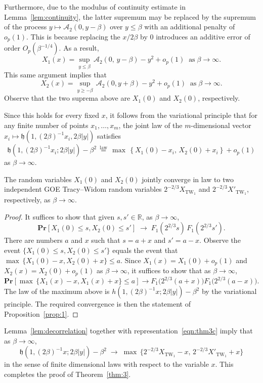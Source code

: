 \documentclass[AHL,Unicode,longabstracts]{cedram}
\DeclareMathOperator{\tw}{TW}
\newcommand{\pr}[1]{\mathbf{Pr}\left[#1\right]}
\newcommand{\R}{\mathbb{R}}
\newcommand{\A}{\mathcal{A}}
\newcommand{\h}{\mathfrak{h}}
\begin{document}
Furthermore, due to the modulus of continuity estimate in Lemma~\ref{lem:continuity}, the latter supremum may be replaced by the supremum of the process $y \mapsto \A_2 (0, y-\beta )$ over $y \leq \beta$ with an additional penalty of $o_p(1)$. This is because replacing the $x/2\beta$ by $0$ introduces an additive error of order $O_p(\beta^{-1/4})$. As a result,
\[
X_1(x) = \sup_{y \leq \beta}\, \A_2(0, \, y-\beta) -y^2 + o_p(1)\;\; \text{as}\; \beta \to \infty.
\]
This same argument implies that
\[
X_2(x) = \sup_{y \geq -\beta}\, \A_2(0,y+\beta) -y^2 + o_p(1)\;\; \text{as}\; \beta \to \infty.
\]
Observe that the two suprema above are $X_1(0)$ and $X_2(0)$, respectively.

Since this holds for every fixed $x$, it follows from the variational principle that for any finite number of points $x_1, \dots, x_m$, the joint law of the $m$-dimensional vector $x_i \mapsto \h(1, (2\beta)^{-1} x_i, 2\beta|y|)$ satisfies
\begin{equation}\label{eqn:thm3c}
\h(1, (2\beta)^{-1} x_i; 2\beta|y|) - \beta^2 \,\overset{\text{law}}{=}\, \max\, \left \{ X_1(0) -x_i,\, X_2(0) +x_i \right \} + o_p(1)
\end{equation}
as $\beta \to \infty$.

\begin{lemm} \label{lem:decorrelation}
The random variables $X_1(0)$ and $X_2(0)$ jointly converge in law to two independent GOE Tracy--Widom random variables $2^{-2/3} X_{\tw_1}$ and $2^{-2/3} X'_{\tw_1}$, respectively, as $\beta \to \infty$.
\end{lemm}

\begin{proof}
It suffices to show that given $s, s' \in \R$, as $\beta \to \infty$,
\[
\pr{X_1(0) \leq s, X_2(0) \leq s'} \; \longrightarrow \;F_1(2^{2/3}s) \, F_1(2^{2/3}s').
\]
There are numbers $a$ and $x$ such that $s = a+x$ and $s' = a-x$. Observe the event $\{X_1(0) \leq s, X_2(0) \leq s'\}$ equals the event that $\max \, \{ X_1(0) - x, X_2(0)+x\} \leq a$. Since $X_1(x) = X_1(0) + o_p(1)$ and $X_2(x) = X_2(0) + o_p(1)$ as $\beta \to \infty$, it suffices to show that as $\beta \to \infty$,
\[
\pr{\max \, \{ X_1(x) - x, X_1(x) +x\} \leq a} \longrightarrow F_1 \big(2^{2/3}(a+x)\big) F_1\big(2^{2/3}(a-x)\big).
\]
The law of the maximum above is $h(1,(2\beta)^{-1}x; 2\beta |y|) - \beta^2$ by the variational principle. The required convergence is then the statement of Proposition~\ref{prop:1}.
\end{proof}

Lemma~\ref{lem:decorrelation} together with representation~\eqref{eqn:thm3c} imply that as $\beta \to \infty$,
\[
\h(1,(2\beta)^{-1}x; 2\beta|y|) - \beta^2 \; \longrightarrow \; \max \, \{ 2^{-2/3}X_{\tw_1} - x, \, 2^{-2/3} X'_{\tw_1}+x\}
\]
in the sense of finite dimensional laws with respect to the variable $x$. This completes the proof of Theorem~\ref{thm:3}.



\end{document}
